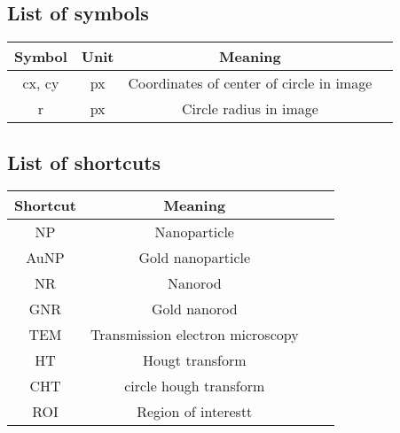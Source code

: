 \pagestyle{plain}

\subsection{List of symbols}

\begin{center}
\begin{tabular}{c c c c} 
 \hline
 \textbf{Symbol} & \textbf{Unit} & \textbf{Meaning} \\
 \hline\hline
 cx, cy & px & Coordinates of center of circle in image \\ 
 \hline
 r & px & Circle radius in image \\
 \hline
\end{tabular}
\end{center}

\subsection{List of shortcuts}

\begin{center}
\begin{tabular}{c c c c} 
 \hline
 \textbf{Shortcut} & \textbf{Meaning} \\
 \hline\hline
 NP & Nanoparticle \\ 
 \hline
 AuNP & Gold nanoparticle \\
 \hline
 NR & Nanorod \\
 \hline
 GNR & Gold nanorod \\
 \hline
 TEM & Transmission electron microscopy \\
 \hline
 HT & Hougt transform \\
 \hline
 CHT & circle hough transform \\
\hline
 ROI & Region of interestt \\
 \hline
\end{tabular}
\end{center}
